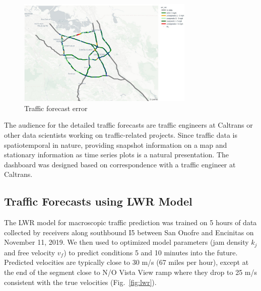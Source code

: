 \documentclass{article}
\begin{document}
\begin{figure}[hbt!]
	\centering
	\includegraphics[width=0.75\textwidth]{images/traffic_map_error.jpeg}
	\caption{Traffic forecast error}
	\label{fig:traffic-error-map}
\end{figure}

The audience for the detailed traffic forecasts are traffic engineers at Caltrans or other data scientists working on traffic-related projects. Since traffic data is spatiotemporal in nature, providing snapshot information on a map and stationary information as time series plots is a natural presentation. The dashboard was designed based on correspondence with a traffic engineer at Caltrans.

\subsection{Traffic Forecasts using LWR Model}

The LWR model for macroscopic traffic prediction was trained on 5 hours of data collected by receivers along southbound I5 between San Onofre and Encinitas on November 11, 2019.  We then used to optimized model parameters (jam density $k_j$ and free velocity $v_f$) to predict conditions 5 and 10 minutes into the future. Predicted velocities are typically close to 30 m/s (67 miles per hour), except at the end of the segment close to N/O Vista View ramp where they drop to 25 m/s 
consistent with the true velocities (Fig.~\ref{fig:lwr}).
\end{document}
